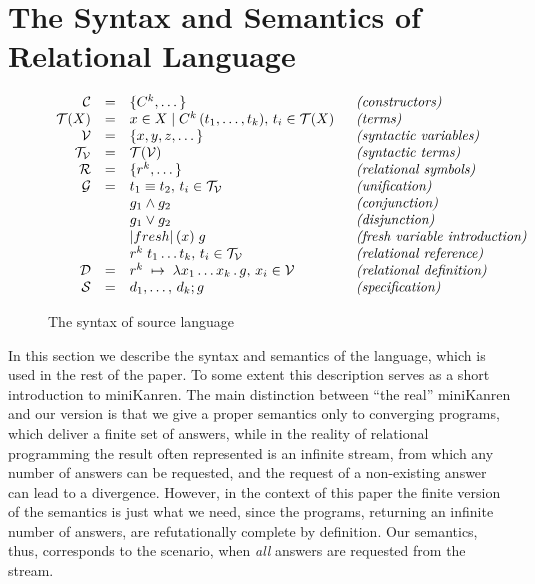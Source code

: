 \section{The Syntax and Semantics of Relational Language}

\begin{figure}[t]
$$
\begin{array}{rcll}
\meta{C}    & = & \{C^k,\dots\}                                        & \;\;\mbox{\emph{(constructors)}}\\
\meta{T}(X) & = & x\in X \mid C^k\,(t_1,\dots,t_k),\,t_i\in \meta{T}(X) & \;\;\mbox{\emph{(terms)}}\\
\meta{V}    & = & \{x, y, z, \dots\}                                   & \;\;\mbox{\emph{(syntactic variables)}}\\
\meta{T_V}  & = & \meta{T}(\meta{V})                                   & \;\;\mbox{\emph{(syntactic terms)}}\\
\meta{R}    & = & \{r^k,\dots\}                                        & \;\;\mbox{\emph{(relational symbols)}}\\
\meta{G}    & = & t_1\equiv t_2,\,t_i\in\meta{T_V}                      & \;\;\mbox{\emph{(unification)}}\\ 
            &   & g_1\wedge g_2                                        & \;\;\mbox{\emph{(conjunction)}}\\
            &   & g_1\vee g_2                                          & \;\;\mbox{\emph{(disjunction)}}\\
            &   &\lstinline|fresh|\,(x)\;g                             & \;\;\mbox{\emph{(fresh variable introduction)}}\\
            &   &r^k\;t_1\dots t_k,\,t_i\in\meta{T_V}                   & \;\;\mbox{\emph{(relational reference)}}\\
\meta{D}    & = & r^k\binds\lambda x_1\dots x_k\,.\,g,\,x_i\in\meta{V}  & \;\;\mbox{\emph{(relational definition)}}\\
\meta{S}    & = & d_1,\dots,\,d_k; g                                    & \;\;\mbox{\emph{(specification)}}
\end{array}
$$
\caption{The syntax of source language}
\label{syntax}
\end{figure}

In this section we describe the syntax and semantics of the language, which is used in the rest of the paper. To some extent this description serves as
a short introduction to miniKanren. The main distinction between ``the real'' miniKanren and our version is that we give a proper semantics only to converging programs, 
which deliver a finite set of answers, while in the reality of relational programming the result often represented is an infinite stream, from which any number of answers can be requested, and the request of a non-existing answer can
lead to a divergence.  
However, in the context of this paper the finite version of the semantics is just what we need, since the programs, returning an infinite number of answers, are refutationally complete by definition. Our semantics, thus, corresponds to
the scenario, when \emph{all} answers are requested from the stream. 

